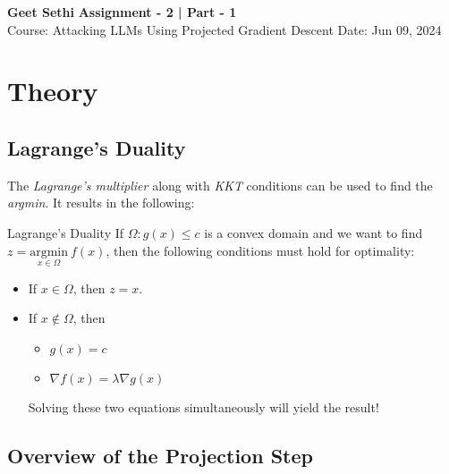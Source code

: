 \documentclass[a4paper, 11pt]{article}
\newcommand{\dfn}[2]{\begin{definition}{#1}{}#2\end{definition}}
\begin{document}
\textsf{\noindent \large\textbf{Geet Sethi} \hfill \textbf{Assignment - 2 | Part - 1} \\
    \normalsize Course: Attacking LLMs Using Projected Gradient Descent \hfill Date: Jun 09, 2024}

\section{Theory}

\subsection{Lagrange's Duality}
The \emph{Lagrange's multiplier} along with \emph{KKT} conditions can be used to find the \emph{argmin}. It results in the following:
\dfn{Lagrange's Duality}{
  If $\Omega: g(x) \le c$ is a convex domain and we want to find $z = \underset{x \in \Omega}{\textrm{argmin}} \ f(x)$, then the following conditions must hold for optimality:
    \begin{itemize}
      \item If $x \in \Omega$, then $z = x$.
      \item If $x \notin \Omega$, then {
    \begin{itemize}
      \item $g(x) = c$
      \item $\nabla f(x) = \lambda \nabla g(x)$
    \end{itemize}
    Solving these two equations simultaneously will yield the result!
        }
    \end{itemize}
}

\subsection{Overview of the Projection Step}
\end{document}
